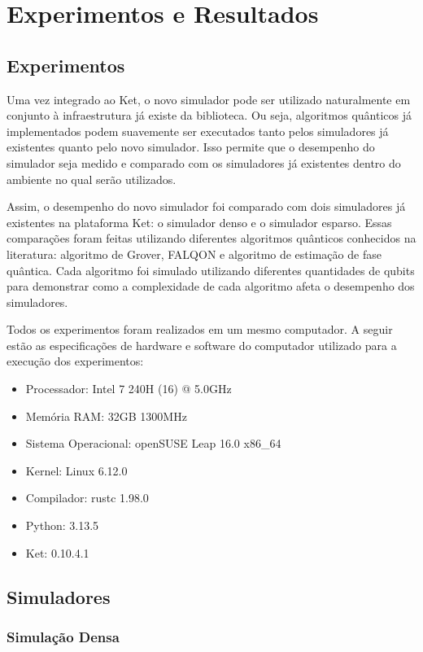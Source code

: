 \chapter{Experimentos e Resultados}\label{chap:experiments}
\section{Experimentos}\label{sec:experiments}

Uma vez integrado ao Ket, o novo simulador pode ser utilizado naturalmente em conjunto à infraestrutura já existe da biblioteca. Ou seja, algoritmos quânticos já implementados podem suavemente ser executados tanto pelos simuladores já existentes quanto pelo novo simulador. Isso permite que o desempenho do simulador seja medido e comparado com os simuladores já existentes dentro do ambiente no qual serão utilizados.

Assim, o desempenho do novo simulador foi comparado com dois simuladores já existentes na plataforma Ket: o simulador denso e o simulador esparso. Essas comparações foram feitas utilizando diferentes algoritmos quânticos conhecidos na literatura: algoritmo de Grover, FALQON e algoritmo de estimação de fase quântica. Cada algoritmo foi simulado utilizando diferentes quantidades de qubits para demonstrar como a complexidade de cada algoritmo afeta o desempenho dos simuladores.

Todos os experimentos foram realizados em um mesmo computador. A seguir estão as especificações de hardware e software do computador utilizado para a execução dos experimentos:

\begin{itemize}
  \item Processador: Intel 7 240H (16) @ 5.0GHz
  \item Memória RAM: 32GB 1300MHz
  \item Sistema Operacional: openSUSE Leap 16.0 x86\_64
  \item Kernel: Linux 6.12.0
  \item Compilador: rustc 1.98.0
  \item Python: 3.13.5
  \item Ket: 0.10.4.1
\end{itemize}

\section{Simuladores}\label{sec:simulators}

\subsection{Simulação Densa}\label{sub:dense}

